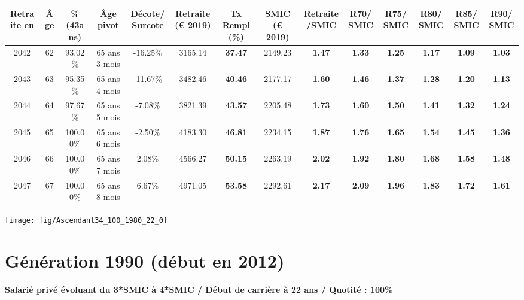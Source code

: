 \begin{adjustbox}{max width=\textwidth} 
\begin{tabular}[htb]{|c|c||c|c|c||c|c||c|c||c|c|c|c|c|} 
\hline 
 Retraite en &  Âge &  \%(43ans) &  Âge pivot &  Décote/Surcote &  Retraite (\euro{} 2019) &  Tx Rempl(\%) &  SMIC (\euro{} 2019) &  Retraite/SMIC &  R70/SMIC &  R75/SMIC &  R80/SMIC &  R85/SMIC &  R90/SMIC \\ 
\hline \hline 
 2042 &  62 &  93.02\% &  65 ans 3 mois &  -16.25\% &  3165.14 &  {\bf 37.47} &  2149.23 &  {\bf 1.47} &  {\bf 1.33} &  {\bf 1.25} &  {\bf 1.17} &  {\bf 1.09} &  {\bf 1.03} \\ 
\hline 
 2043 &  63 &  95.35\% &  65 ans 4 mois &  -11.67\% &  3482.46 &  {\bf 40.46} &  2177.17 &  {\bf 1.60} &  {\bf 1.46} &  {\bf 1.37} &  {\bf 1.28} &  {\bf 1.20} &  {\bf 1.13} \\ 
\hline 
 2044 &  64 &  97.67\% &  65 ans 5 mois &  -7.08\% &  3821.39 &  {\bf 43.57} &  2205.48 &  {\bf 1.73} &  {\bf 1.60} &  {\bf 1.50} &  {\bf 1.41} &  {\bf 1.32} &  {\bf 1.24} \\ 
\hline 
 2045 &  65 &  100.00\% &  65 ans 6 mois &  -2.50\% &  4183.30 &  {\bf 46.81} &  2234.15 &  {\bf 1.87} &  {\bf 1.76} &  {\bf 1.65} &  {\bf 1.54} &  {\bf 1.45} &  {\bf 1.36} \\ 
\hline 
 2046 &  66 &  100.00\% &  65 ans 7 mois &  2.08\% &  4566.27 &  {\bf 50.15} &  2263.19 &  {\bf 2.02} &  {\bf 1.92} &  {\bf 1.80} &  {\bf 1.68} &  {\bf 1.58} &  {\bf 1.48} \\ 
\hline 
 2047 &  67 &  100.00\% &  65 ans 8 mois &  6.67\% &  4971.05 &  {\bf 53.58} &  2292.61 &  {\bf 2.17} &  {\bf 2.09} &  {\bf 1.96} &  {\bf 1.83} &  {\bf 1.72} &  {\bf 1.61} \\ 
\hline 
\hline 
\end{tabular} 
\end{adjustbox} 
 
 \vspace{0.1cm} 

 {\hspace{-2.2cm}\texttt{[image: fig/Ascendant34\_100\_1980\_22\_0]}} 

\newpage 
 
\section{Génération 1990 (début en 2012)\label{Ascendant34_100_1990_22_0}} 
 
{\bf \noindent Salarié privé évoluant du 3*SMIC à 4*SMIC / Début de carrière à 22 ans / Quotité : 100\%}  ~ 

